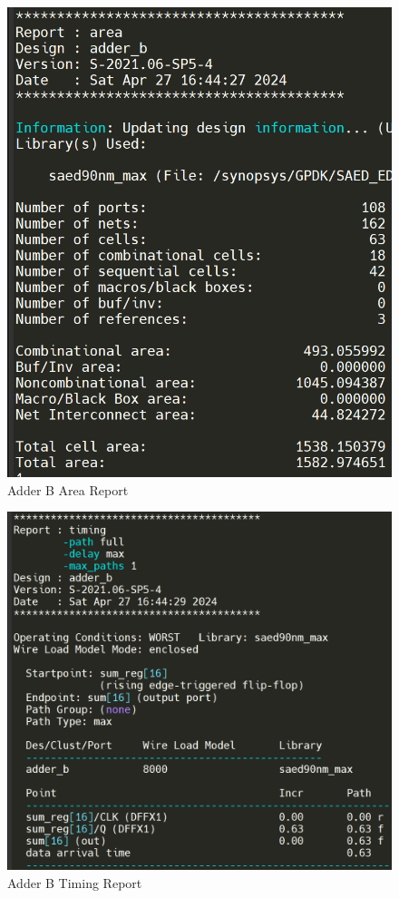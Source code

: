 \documentclass{article}
\begin{document}
\begin{figure}[!ht] 
    \centering
    \includegraphics*[width = 15.1cm]{adder_b_area.png}
    \caption{Adder B Area Report}
    \label{fig:barea}
\end{figure}    

\begin{figure}[!ht] 
    \centering
    \includegraphics*[width = 15.1cm]{adder_b_timing.png}
    \caption{Adder B Timing Report}
    \label{fig:btiming}
\end{figure}    
\end{document}
